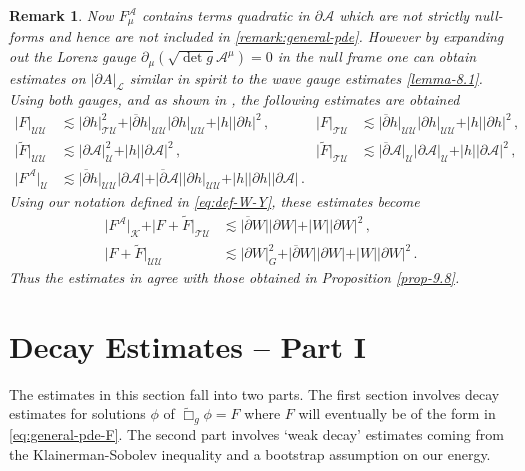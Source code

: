 \documentclass[11pt, a4paper]{amsart}
\numberwithin{equation}{section}
\newtheorem{remark}[theorem]{Remark}
\numberwithin{theorem}{section}
\newcommand{\p}{\partial}
\newcommand{\A}{\mathcal{A}}
\newcommand{\pgood}{\overline{\partial}}
\newcommand{\tbox}{\widetilde{\Box}}
\newcommand{\UU}{{\mathcal{U} \mathcal{U}}}
\newcommand{\TU}{{\mathcal{T} \mathcal{U}}}
\newcommand{\U}{\mathcal{U}}
\newcommand{\K}{\mathcal{K}}
\begin{document}
\begin{remark}
Now $F^\A_\mu$ contains terms quadratic in $\p \A$ which are not strictly null-forms and hence are not included in \eqref{remark:general-pde}. However by expanding out the Lorenz gauge $\p_\mu \left( \sqrt{\det g} \A^\mu \right)=0$ in the null frame one can obtain estimates on $\vert \p A \vert_{\mathcal{L}}$ similar in spirit to the wave gauge estimates \eqref{lemma-8.1}.  Using both gauges, and as shown in \cite{MR2582443}, the following estimates are obtained
\begin{align*}
\vert F \vert_\UU & \lesssim \vert \p h \vert^2_\TU + \vert \pgood h \vert_\UU \vert \p h \vert_\UU + \vert h \vert \vert \p h \vert^2 \,, 
& \vert F \vert_\TU & \lesssim \vert \pgood h \vert_\UU \vert \p h \vert_\UU + \vert h \vert \vert \p h \vert^2 \,, \\
\vert \widetilde{F} \vert_\UU & \lesssim \vert \p \A \vert_\U^2 + \vert h \vert \vert \p \A \vert^2 \,, 
& \vert \widetilde{F} \vert_\TU & \lesssim \vert \pgood \A \vert_\U \vert \p \A \vert_\U + \vert h \vert \vert \p \A \vert^2 \,, \\
\vert F^\A \vert_\U & \lesssim \vert \pgood h \vert_\UU \vert \p \A \vert + \vert \pgood \A \vert \vert \p h \vert_\UU + \vert h \vert \vert \p h \vert \vert \p \A \vert \,.
\end{align*}
Using our notation defined in \eqref{eq:def-W-Y}, these estimates become
\begin{align*}
\vert F^\A \vert_\K + \vert F +\widetilde{F} \vert_\TU & \lesssim \vert \pgood W \vert \vert \p W \vert + \vert W \vert \vert \p W \vert^2 \,, \\
\vert F + \widetilde{F} \vert_\UU &\lesssim \vert \p W \vert_G^2 + \vert \pgood W \vert \vert \p W \vert + \vert W \vert \vert \p W \vert^2 \,.  
\end{align*}
Thus the estimates in \cite{MR2582443} agree with those obtained in Proposition \ref{prop-9.8}. 
\end{remark}

\section{Decay Estimates -- Part I} \label{section:decay-1} 
The estimates in this section fall into two parts. The first section involves decay estimates for solutions $\phi$ of $\tbox_g \phi = F$ where $F$ will eventually be of the form in \eqref{eq:general-pde-F}. The second part involves `weak decay' estimates coming from the Klainerman-Sobolev inequality and a bootstrap assumption on our energy. 
\end{document}
